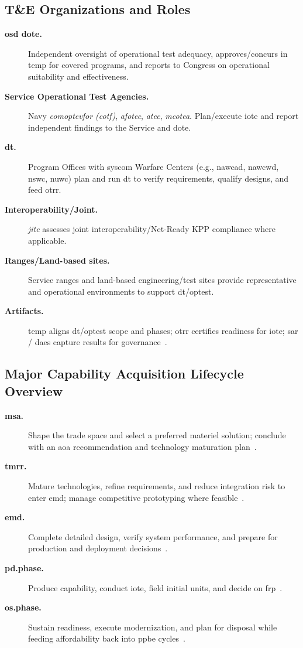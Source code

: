 \documentclass[../main.tex]{subfiles}
\begin{document}
\subsection{T\&E Organizations and Roles}
\begin{description}
  \item[\textbf{\ac{osd} \ac{dote}.}] Independent oversight of operational test adequacy, approves/concurs in \ac{temp} for covered programs, and reports to Congress on operational suitability and effectiveness.
  \item[\textbf{Service Operational Test Agencies.}] Navy \emph{\ac{comoptevfor} (\ac{cotf})}, \emph{\ac{afotec}}, \emph{\ac{atec}}, \emph{\ac{mcotea}}. Plan/execute \ac{iote} and report independent findings to the Service and \ac{dote}.
  \item[\textbf{\ac{dt}.}] Program Offices with \ac{syscom} Warfare Centers (e.g., \ac{nawcad}, \ac{nawcwd}, \ac{nswc}, \ac{nuwc}) plan and run \ac{dt} to verify requirements, qualify designs, and feed \ac{otrr}.
  \item[\textbf{Interoperability/Joint.}] \emph{\ac{jitc}} assesses joint interoperability/Net-Ready KPP compliance where applicable.
  \item[\textbf{Ranges/Land-based sites.}] Service ranges and land-based engineering/test sites provide representative and operational environments to support \ac{dt}/\ac{optest}.
  \item[\textbf{Artifacts.}] \ac{temp} aligns \ac{dt}/\ac{optest} scope and phases; \ac{otrr} certifies readiness for \ac{iote}; \ac{sar} / \ac{daes} capture results for governance~\autocite{DoDI5000-85}.
\end{description}

\subsection{Major Capability Acquisition Lifecycle Overview}
\begin{description}
	\item[\textbf{\ac{msa}.}] Shape the trade space and select a preferred materiel solution; conclude with an \ac{aoa} recommendation and technology maturation plan~\autocite{DoDI5000-85}.
	\item[\textbf{\ac{tmrr}.}] Mature technologies, refine requirements, and reduce integration risk to enter \ac{emd}; manage competitive prototyping where feasible~\autocite{DoDI5000-85}.
	\item[\textbf{\ac{emd}.}] Complete detailed design, verify system performance, and prepare for production and deployment decisions~\autocite{DoDI5000-85}.
	\item[\textbf{\ac{pd.phase}.}] Produce capability, conduct \ac{iote}, field initial units, and decide on \ac{frp}~\autocite{DoDI5000-85}.
	\item[\textbf{\ac{os.phase}.}] Sustain readiness, execute modernization, and plan for disposal while feeding affordability back into \ac{ppbe} cycles~\autocite{DoDI5000-85}.
\end{description}
\end{document}
